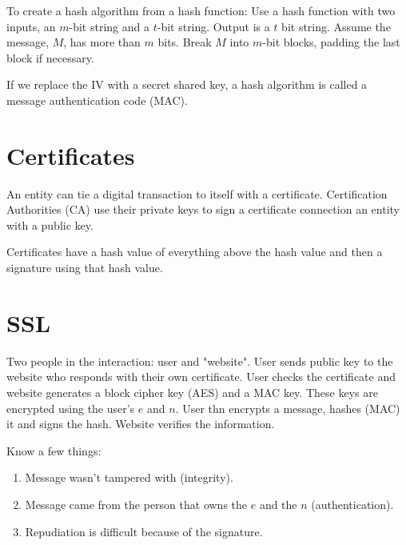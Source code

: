 \documentclass{article}
\begin{document}
To create a hash algorithm from a hash function: Use a hash function with two
inputs, an $m$-bit string and a $t$-bit string. Output is a $t$ bit string.
Assume the message, $M$, has more than $m$ bits. Break $M$ into $m$-bit blocks,
padding the last block if necessary.

If we replace the IV with a secret shared key, a hash algorithm is called a
message authentication code (MAC).

\section{Certificates}
An entity can tie a digital transaction to itself with a certificate.
Certification Authorities (CA) use their private keys to sign a certificate
connection an entity with a public key.

Certificates have a hash value of everything above the hash value and then a
signature using that hash value.

\section{SSL}
Two people in the interaction: user and "website". User sends public key to the
website who responds with their own certificate. User checks the certificate
and website generates a block cipher key (AES) and a MAC key. These keys are
encrypted using the user's $e$ and $n$. User thn encrypts a message, hashes
(MAC) it and signs the hash. Website verifies the information.

Know a few things:
\begin{enumerate}
  \item Message wasn't tampered with (integrity).
  \item Message came from the person that owns the $e$ and the $n$
    (authentication).
  \item Repudiation is difficult because of the signature.
\end{enumerate}
\end{document}
